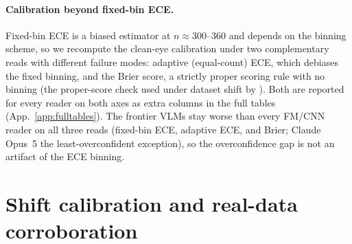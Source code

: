 \paragraph{Calibration beyond fixed-bin ECE.} Fixed-bin ECE is a biased estimator at $n{\approx}300$--$360$ and
depends on the binning scheme, so we recompute the clean-eye calibration under two complementary reads with different
failure modes: adaptive (equal-count) ECE, which debiases the fixed binning, and the Brier score, a strictly proper
scoring rule with no binning (the proper-score check used under dataset shift by \citet{ovadia2019shift}). Both are
reported for every reader on both axes as extra columns in the full tables (App.~\ref{app:fulltables}). The frontier
VLMs stay worse than every FM/CNN reader on all three reads (fixed-bin ECE, adaptive ECE, and Brier; Claude Opus~5 the
least-overconfident exception), so the overconfidence gap is not an artifact of the ECE binning.

\section{Shift calibration and real-data corroboration}
\label{app:validity}

